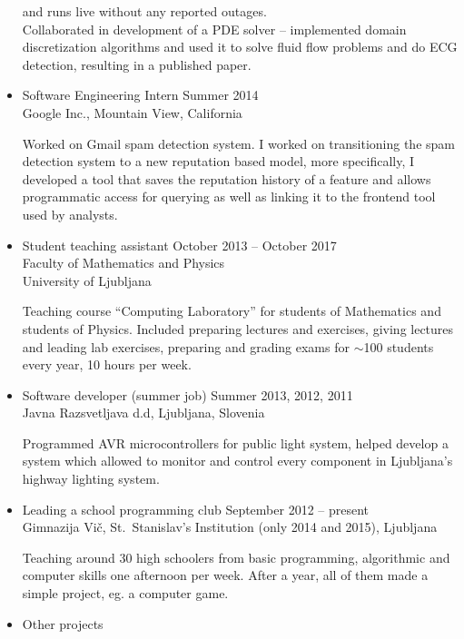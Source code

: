 \documentclass[line,margin]{res}
\newcommand{\wmeta}[1]{\sf#1\rm}
\newcommand{\wdesc}[1]{

#1

\vspace{6pt}}
\newenvironment{itemize*}{\vspace{-2.5\parskip}\begin{itemize}\setlength{\itemsep}{0pt}\setlength{\parskip}{2pt}}{\end{itemize}\vspace{-1\parskip}}
\begin{document}
\begin{itemize}
{    and runs live without any reported outages. \\[3pt]
    Collaborated in development of a PDE solver  -- implemented domain
    discretization algorithms and used it to solve fluid flow problems and do
    ECG detection, resulting in a published paper.}
  \item \wmeta{Software Engineering Intern \hfill Summer 2014 \\
    \hspace*{\fill} Google Inc., Mountain View, California}
  \wdesc{Worked on Gmail spam detection system. I worked on transitioning
    the spam detection system to a new reputation based model, more
    specifically, I developed a tool that saves the reputation history of a
    feature and allows programmatic access for querying as well as linking it to
    the frontend tool used by analysts.}
  \item \wmeta{Student teaching assistant \hfill October 2013 -- October 2017 \\
    \hspace*{\fill}  Faculty of Mathematics and Physics \\
    \hspace*{\fill}  University of Ljubljana}
  \wdesc{Teaching course ``Computing Laboratory'' for students of Mathematics and
    students of Physics. Included preparing lectures and exercises, giving
    lectures and leading lab exercises, preparing and grading exams for
    $\sim$100 students every year, 10 hours per week.}
  \item \wmeta{Software developer (summer job) \hfill Summer 2013, 2012, 2011 \\
    \hspace*{\fill} Javna Razsvetljava d.d, Ljubljana, Slovenia}
  \wdesc{Programmed AVR microcontrollers for public light system, helped
    develop a system which allowed to monitor and control every component in
    Ljubljana's highway lighting system.}
  \item \wmeta{Leading a school programming club \hfill September 2012 -- present \\
    \hspace*{\fill} Gimnazija Vič, St.\ Stanislav's Institution (only 2014 and 2015), Ljubljana}
  \wdesc{Teaching around 30 high schoolers from basic programming, algorithmic
    and computer skills one afternoon per week. After a year, all of them made a
    simple project, eg. a computer game.}
  \item \wmeta{Other projects}
  \begin{itemize*}

\end{itemize*}
\end{itemize}
\end{document}

